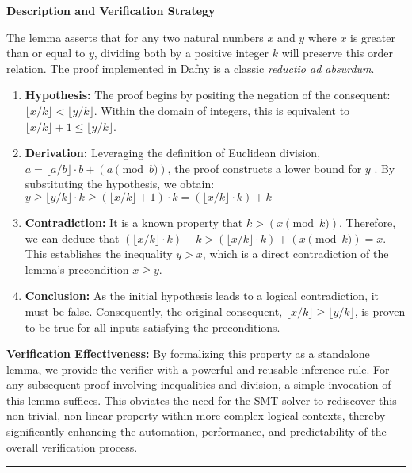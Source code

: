 \documentclass[
  english,
  onecolumn]{article}
\providecommand{\tightlist}{%
  \setlength{\itemsep}{0pt}\setlength{\parskip}{0pt}}
\begin{document}
\textbf{Description and Verification Strategy}

The lemma asserts that for any two natural numbers \(x\) and \(y\) where
\(x\) is greater than or equal to \(y\), dividing both by a positive
integer \(k\) will preserve this order relation. The proof implemented
in Dafny is a classic \emph{reductio ad absurdum}.

\begin{enumerate}
\def\labelenumi{\arabic{enumi}.}
\tightlist
\item
  \textbf{Hypothesis:} The proof begins by positing the negation of the
  consequent: \(\lfloor x/k \rfloor < \lfloor y/k \rfloor\). Within the
  domain of integers, this is equivalent to
  \(\lfloor x/k \rfloor + 1 \le \lfloor y/k \rfloor\).
\item
  \textbf{Derivation:} Leveraging the definition of Euclidean division,
  \(a = \lfloor a/b \rfloor \cdot b + (a \pmod b)\), the proof
  constructs a lower bound for \(y\) \citep{knuth1997art}. By
  substituting the hypothesis, we obtain:
  \(y \ge \lfloor y/k \rfloor \cdot k \ge (\lfloor x/k \rfloor + 1) \cdot k = (\lfloor x/k \rfloor \cdot k) + k\)
\item
  \textbf{Contradiction:} It is a known property that
  \(k > (x \pmod k)\). Therefore, we can deduce that
  \((\lfloor x/k \rfloor \cdot k) + k > (\lfloor x/k \rfloor \cdot k) + (x \pmod k) = x\).
  This establishes the inequality \(y > x\), which is a direct
  contradiction of the lemma's precondition \(x \ge y\).
\item
  \textbf{Conclusion:} As the initial hypothesis leads to a logical
  contradiction, it must be false. Consequently, the original
  consequent, \(\lfloor x/k \rfloor \ge \lfloor y/k \rfloor\), is proven
  to be true for all inputs satisfying the preconditions.
\end{enumerate}

\textbf{Verification Effectiveness:} By formalizing this property as a
standalone lemma, we provide the verifier with a powerful and reusable
inference rule. For any subsequent proof involving inequalities and
division, a simple invocation of this lemma suffices. This obviates the
need for the SMT solver to rediscover this non-trivial, non-linear
property within more complex logical contexts, thereby significantly
enhancing the automation, performance, and predictability of the overall
verification process.

\begin{center}\rule{0.5\linewidth}{0.5pt}\end{center}
\end{document}
